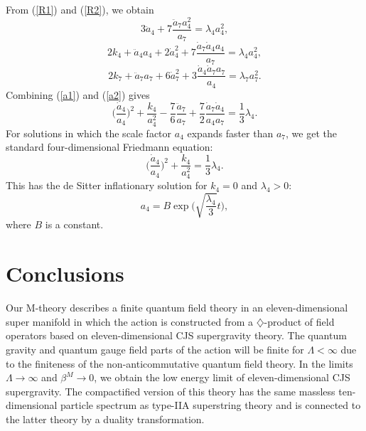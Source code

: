 \documentclass[a4paper,12pt]{article}
\begin{document}
From (\ref{R1}) and (\ref{R2}), we obtain
\begin{equation}
\label{a1}
3{\ddot a}_4+7\frac{{\ddot a}_7a^2_4}{a_7}=\lambda_4a^2_4,
\end{equation}
\begin{equation}
\label{a2}
2k_4+{\ddot a}_4a_4+2{\dot a}^2_4+7\frac{{\dot a}_7{\dot
a}_4a_4}{a_7}=\lambda_4a^2_4,
\end{equation}
\begin{equation}
2k_7+{\ddot a}_7a_7+6{\dot a}^2_7
+3\frac{{\dot a}_4{\dot a}_7a_7}{a_4}=\lambda_7a^2_7.
\end{equation}
Combining (\ref{a1}) and (\ref{a2}) gives
\begin{equation}
\biggl(\frac{{\dot a}_4}{a_4}\biggr)^2+\frac{k_4}{a^2_4}
-\frac{7}{6}\frac{{\ddot a}_7}{a_7}
+\frac{7}{2}\frac{{\dot a}_7{\dot a}_4}{a_4a_7}=\frac{1}{3}\lambda_4.
\end{equation}
For solutions in which the scale factor $a_4$ expands
faster than $a_7$, we get the standard four-dimensional Friedmann equation:
\begin{equation}
\biggl(\frac{{\dot a}_4}{a_4}\biggr)^2
+\frac{k_4}{a^2_4}=\frac{1}{3}\lambda_4.
\end{equation}
This has the de Sitter inflationary solution for $k_4=0$ and $\lambda_4 >
0$:
\begin{equation}
a_4=B\exp\biggl(\sqrt{\frac{\lambda_4}{3}}t\biggr),
\end{equation}
where $B$ is a constant.

\section{Conclusions}

Our M-theory describes a finite quantum field theory in an
eleven-dimensional super manifold in which the action is constructed from a
$\diamondsuit$-product of field operators based on eleven-dimensional CJS
supergravity theory. The quantum gravity and quantum gauge field parts of
the action will be finite for $\Lambda < \infty$ due to the finiteness of
the non-anticommutative quantum field theory. In the limits
$\Lambda\rightarrow\infty$ and $\beta^M\rightarrow 0$, we obtain the low
energy limit of eleven-dimensional CJS supergravity. The compactified
version of this theory has the same massless ten-dimensional particle
spectrum as type-IIA superstring theory and is connected to the latter
theory by a duality transformation.
\end{document}
